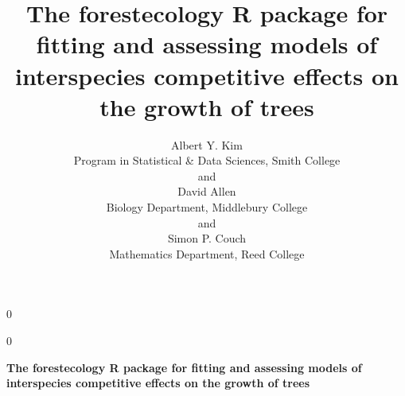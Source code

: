 \documentclass[12pt]{article}
\newcommand{\blind}{0}
\begin{document}
\def\spacingset#1{\renewcommand{\baselinestretch}%
{#1}\small\normalsize} \spacingset{1}



\blind
{
  \title{\bf The forestecology R package for fitting and assessing
models of interspecies competitive effects on the growth of trees}

  \author{
        Albert Y. Kim \\
    Program in Statistical \& Data Sciences, Smith College\\
     and \\     David Allen \\
    Biology Department, Middlebury College\\
     and \\     Simon P. Couch \\
    Mathematics Department, Reed College\\
      }
  \maketitle
} \fi

\blind
{
  \bigskip
  \bigskip
  \bigskip
  \begin{center}
    {\LARGE\bf The forestecology R package for fitting and assessing
models of interspecies competitive effects on the growth of trees}
  \end{center}
  \medskip
} \fi
\end{document}
